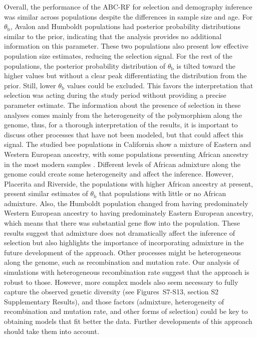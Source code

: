\documentclass[a4paper, 12pt]{article}
\begin{document}
Overall, the performance of the ABC-RF for selection and demography inference was similar across populations despite the differences in sample size and age. For $\theta_{\mathrm{b}}$, Avalon and Humboldt populations had posterior probability distributions similar to the prior, indicating that the analysis provides no additional information on this parameter. These two populations also present low effective population size estimates, reducing the selection signal. For the rest of the populations, the posterior probability distribution of $\theta_{\mathrm{b}}$ is tilted toward the higher values but without a clear peak differentiating the distribution from the prior. Still, lower $\theta_{\mathrm{b}}$ values could be excluded. This favors the interpretation that selection was acting during the study period without providing a precise parameter estimate. The information about the presence of selection in these analyses comes mainly from the heterogeneity of the polymorphism along the genome, thus, for a thorough interpretation of the results, it is important to discuss other processes that have not been modeled, but that could affect this signal. The studied bee populations in California show a mixture of Eastern and Western European ancestry, with some populations presenting African ancestry in the most modern samples \citet{Cridland:2018fx}. Different levels of African admixture along the genome could create some heterogeneity and affect the inference. However, Placerita and Riverside, the populations with higher African ancestry at present, present similar estimates of $\theta_{\mathrm{b}}$ that populations with little or no African admixture. Also, the Humboldt population changed from having predominately Western European ancestry to having predominately Eastern European ancestry, which means that there was substantial gene flow into the population. These results suggest that admixture does not dramatically affect the inference of selection but also highlights the importance of incorporating admixture in the future development of the approach. Other processes might be heterogeneous along the genome, such as recombination and mutation rate. Our analysis of simulations with heterogeneous recombination rate suggest that the approach is robust to those. However, more complex models also seem necessary to fully capture the observed genetic diversity (see Figures~S7-S13, section S2 Supplementary Results), and those factors (admixture, heterogeneity of recombination and mutation rate, and other forms of selection) could be key to obtaining models that fit better the data. Further developments of this approach should take them into account.
\end{document}

